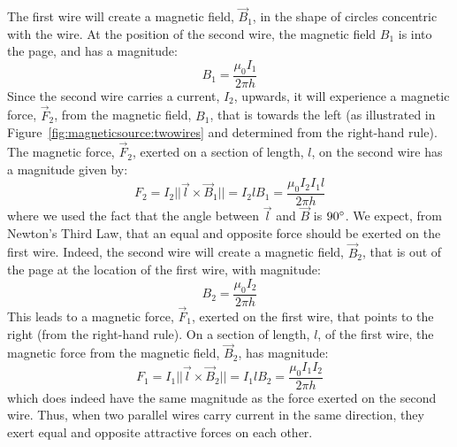 The first wire will create a magnetic field, $\vec B_1$, in the shape of circles concentric with the wire. At the position of the second wire, the magnetic field $B_1$ is into the page, and has a magnitude:
\begin{equation}
B_1 = \frac{\mu_0 I_1}{2\pi h}
\end{equation}
Since the second wire carries a current, $I_2$, upwards, it will experience a magnetic force, $\vec F_2$, from the magnetic field, $B_1$, that is towards the left (as illustrated in Figure~\ref{fig:magneticsource:twowires} and determined from the right-hand rule). The magnetic force, $\vec F_2$, exerted on a section of length, $l$, on the second wire has a magnitude given by:
\begin{equation}
F_2 = I_2 ||\vec l \times \vec B_1||=I_2 l B_1 =\frac{\mu_0 I_2 I_1 l}{2\pi h}
\end{equation}
where we used the fact that the angle between $\vec l$ and $\vec B$ is $90 {\rm \degree}$. We expect, from Newton's Third Law, that an equal and opposite force should be exerted on the first wire. Indeed, the second wire will create a magnetic field, $\vec B_2$, that is out of the page at the location of the first wire, with magnitude:
\begin{equation}
B_2 = \frac{\mu_0 I_2}{2\pi h}
\end{equation}
This leads to a magnetic force, $\vec F_1$, exerted on the first wire, that points to the right (from the right-hand rule). On a section of length, $l$, of the first wire, the magnetic force from the magnetic field, $\vec B_2$, has magnitude:
\begin{equation}
F_1 = I_1 ||\vec l \times \vec B_2||=I_1 l B_2 =\frac{\mu_0 I_1 I_2}{2\pi h}
\end{equation}
which does indeed have the same magnitude as the force exerted on the second wire. Thus, when two parallel wires carry current in the same direction, they exert equal and opposite attractive forces on each other.

